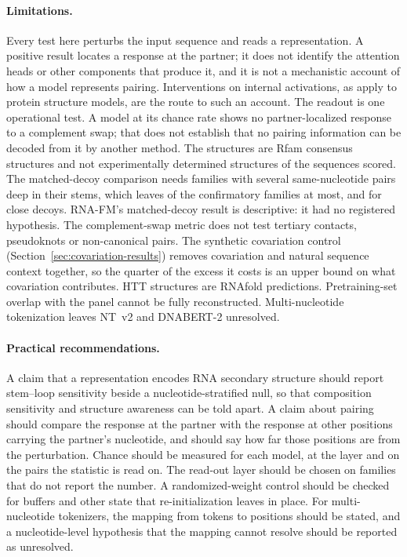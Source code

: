 \documentclass[11pt]{article}
\begin{document}
\paragraph{Limitations.}
Every test here perturbs the input sequence and reads a representation. A
positive result locates a response at the partner; it does not identify the
attention heads or other components that produce it, and it is not a
mechanistic account of how a model represents pairing. Interventions on
internal activations, as \citet{lu2026two} apply to protein structure models,
are the route to such an account. The readout is one
operational test. A model at its chance rate shows no
partner-localized response to a complement swap; that does not establish that
no pairing information can be decoded from it by another method. The
structures are Rfam consensus structures and not experimentally determined
structures of the sequences scored. The matched-decoy comparison needs
families with several same-nucleotide pairs deep in their stems, which leaves
\decoyAllFamiliesErnieRNA{} of the \confirmatoryN{} confirmatory families at
most, and \decoyCloseFamiliesErnieRNA{} for close decoys. RNA-FM's
matched-decoy result is descriptive: it had no registered hypothesis. The
complement-swap metric does not test tertiary contacts, pseudoknots or
non-canonical pairs. The synthetic covariation control
(Section~\ref{sec:covariation-results}) removes covariation and natural
sequence context together, so the quarter of the excess it costs is an upper
bound on what covariation contributes. HTT structures are RNAfold predictions.
Pretraining-set overlap with the panel cannot be fully reconstructed.
Multi-nucleotide tokenization leaves NT~v2 and DNABERT-2 unresolved.

\paragraph{Practical recommendations.}
A claim that a representation encodes RNA secondary structure should report
stem--loop sensitivity beside a nucleotide-stratified null, so that composition
sensitivity and structure awareness can be told apart. A claim about pairing
should compare the response at the partner with the response at other
positions carrying the partner's nucleotide, and should say how far those
positions are from the perturbation. Chance should be measured for each model,
at the layer and on the pairs the statistic is read on. The read-out layer
should be chosen on families that do not report the number. A randomized-weight
control should be checked for buffers and other state that re-initialization
leaves in place. For multi-nucleotide tokenizers, the mapping from tokens to
positions should be stated, and a nucleotide-level hypothesis that the mapping
cannot resolve should be reported as unresolved.
\end{document}
